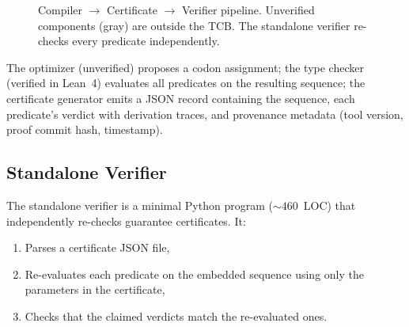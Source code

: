 \documentclass[runningheads]{llncs}
\begin{document}
\begin{figure}[t]
\centering
{}
\caption{Compiler $\to$ Certificate $\to$ Verifier pipeline.
         Unverified components (gray) are outside the TCB.
         The standalone verifier re-checks every predicate
         independently.}
\label{fig:certpipeline}
\end{figure}

The optimizer (unverified) proposes a codon assignment; the type
checker (verified in Lean~4) evaluates all predicates on the resulting
sequence; the certificate generator emits a JSON record containing the
sequence, each predicate's verdict with derivation traces, and
provenance metadata (tool version, proof commit hash, timestamp).

\subsection{Standalone Verifier}\label{sec:verifier}

The standalone verifier is a minimal Python program (${\sim}460$~LOC)
that independently re-checks guarantee certificates.
It:
\begin{enumerate}[leftmargin=*,itemsep=0pt,topsep=1pt]
\item Parses a certificate JSON file,
\item Re-evaluates each predicate on the embedded sequence using only
      the parameters in the certificate,
\item Checks that the claimed verdicts match the re-evaluated ones.
\end{enumerate}
\end{document}
